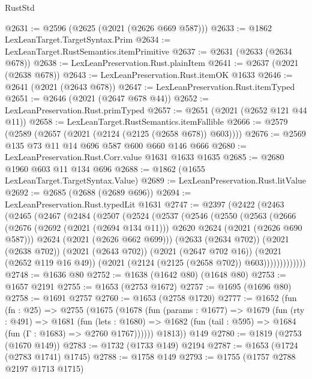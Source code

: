 \begin{lexlean}{RustStd}
\begin{coremodule}
{\begin{coremodule}
{{{{{{{{{{{{{{{{@2631 := @2596 (@2625 (@2021 (@2626 @669 @587)))
@2633 := @1862 LexLeanTarget.TargetSyntax.Prim
@2634 := LexLeanTarget.RustSemantics.itemPrimitive
@2637 := @2631 (@2633 (@2634 @678))
@2638 := LexLeanPreservation.Rust.plainItem
@2641 := @2637 (@2021 (@2638 @678))
@2643 := LexLeanPreservation.Rust.itemOK @1633
@2646 := @2641 (@2021 (@2643 @678))
@2647 := LexLeanPreservation.Rust.itemTyped
@2651 := @2646 (@2021 (@2647 @678 @44))
@2652 := LexLeanPreservation.Rust.primTyped
@2657 := @2651 (@2021 (@2652 @121 @44 @11))
@2658 := LexLeanTarget.RustSemantics.itemFallible
@2666 := @2579 (@2589 (@2657 (@2021 (@2124 (@2125 (@2658 @678)) @603))))
@2676 := @2569 @135 @73 @11 @14 @696 @587 @600 @660 @146 @666
@2680 := LexLeanPreservation.Rust.Corr.value @1631 @1633 @1635
@2685 := @2680 @1960 @603 @11 @134 @696
@2688 := @1862 (@1655 LexLeanTarget.TargetSyntax.Value)
@2689 := LexLeanPreservation.Rust.litValue
@2692 := @2685 (@2688 (@2689 @696))
@2694 := LexLeanPreservation.Rust.typedLit @1631
@2747 := @2397
    (@2422
      (@2463
        (@2465
          (@2467
            (@2484
              (@2507
                (@2524
                  (@2537
                    (@2546
                      (@2550
                        (@2563
                          (@2666
                            (@2676
                              (@2692 (@2021 (@2694 @134 @11)))
                              @2620
                              @2624
                              (@2021 (@2626 @690 @587)))
                            @2624
                            (@2021 (@2626 @662 @699)))
                          (@2633 (@2634 @702))
                          (@2021 (@2638 @702))
                          (@2021 (@2643 @702))
                          (@2021 (@2647 @702 @16))
                          (@2021 (@2652 @119 @16 @49))
                          (@2021 (@2124 (@2125 (@2658 @702)) @603)))))))))))))
@2748 := @1636 @80
@2752 := @1638 (@1642 @80) (@1648 @80)
@2753 := @1657 @2191
@2755 := @1653 (@2753 @1672)
@2757 := @1695 (@1696 @80)
@2758 := @1691 @2757
@2760 := @1653 (@2758 @1720)
@2777 := @1652
    (fun (fn : @25) =>
    @2755
      (@1675
        (@1678
          (fun (params : @1677) =>
          @1679
            (fun (rty : @491) =>
            @1681
              (fun (lets : @1680) =>
              @1682 (fun (tail : @595) => @1684 (fun (Γ : @1683) => @2760 @1767))))))
        @1813))
    @149
@2780 := @1819 (@2753 (@1670 @149))
@2783 := @1732 (@1733 @149) @2194
@2787 := @1653 (@1724 (@2783 @1741) @1745)
@2788 := @1758 @149
@2793 := @1755 (@1757 @2788 @2197 @1713 @1715)
}}}}}}}}}}}}}}}}
\end{coremodule}}
\end{coremodule}
\end{lexlean}
